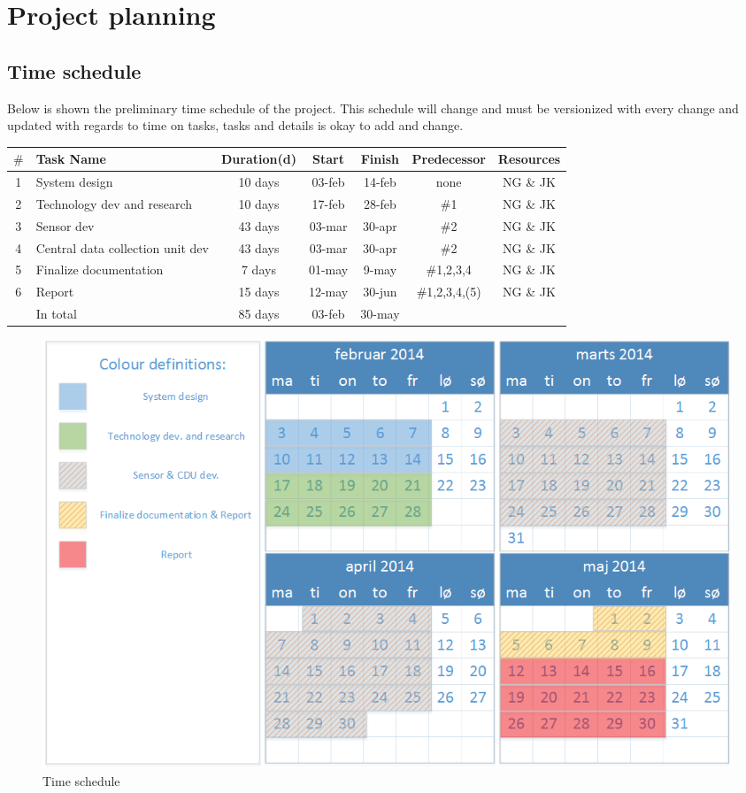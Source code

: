 \chapter{Project planning}
\section{Time schedule}
Below is shown the preliminary time schedule of the project. This schedule will change and must be versionized with every change and updated with regards to time on tasks, tasks and details is okay to add and change.\\ 

\begin{table}[H]
\centering
\begin{tabular}{|c |p{4cm} |c |c |c |c |c|}
\hline 
$\#$ & Task Name & Duration(d) & Start & Finish & Predecessor & Resources \\ 
\hline 
1 & System design & 10 days & 03-feb & 14-feb & none & NG \& JK \\ 
\hline 
2 & Technology dev and research & 10 days & 17-feb & 28-feb & $\#$1 & NG \& JK \\ 
\hline 
3 & Sensor dev & 43 days & 03-mar & 30-apr & $\#$2 & NG \& JK \\ 
\hline 
4 & Central data collection unit dev & 43 days & 03-mar & 30-apr & $\#$2 & NG \& JK \\ 
\hline 
5 & Finalize documentation & 7 days & 01-may & 9-may & $\#$1,2,3,4 & NG \& JK \\ 
\hline 
6 & Report & 15 days & 12-may & 30-jun & $\#$1,2,3,4,(5) & NG \& JK \\ 
\hline \hline
~ & In total & 85 days & 03-feb & 30-may & ~ & ~ \\ 
\hline 
\end{tabular} 
\end{table}

\begin{figure}[H]
\centering
\includegraphics[width=.9\textwidth]{billeder/timeschedule_new.png}
\caption{Time schedule}
\end{figure}

